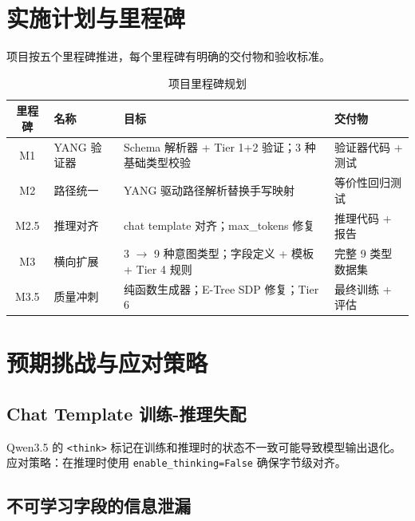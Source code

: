 \documentclass[12pt, a4paper]{article}
\begin{document}
\section{实施计划与里程碑}
\label{sec:milestones}

项目按五个里程碑推进，每个里程碑有明确的交付物和验收标准。

\begin{table}[H]
\centering
\caption{项目里程碑规划}
\label{tab:milestones}
\small
\begin{tabular}{clp{5.5cm}p{3.5cm}}
\toprule
\textbf{里程碑} & \textbf{名称} & \textbf{目标} & \textbf{交付物} \\
\midrule
M1 & YANG 验证器 &
  Schema 解析器 + Tier 1+2 验证；3 种基础类型校验 &
  验证器代码 + 测试 \\
\addlinespace
M2 & 路径统一 &
  YANG 驱动路径解析替换手写映射 &
  等价性回归测试 \\
\addlinespace
M2.5 & 推理对齐 &
  chat template 对齐；max\_tokens 修复 &
  推理代码 + 报告 \\
\addlinespace
M3 & 横向扩展 &
  3 $\to$ 9 种意图类型；字段定义 + 模板 + Tier 4 规则 &
  完整 9 类型数据集 \\
\addlinespace
M3.5 & 质量冲刺 &
  纯函数生成器；E-Tree SDP 修复；Tier 6 &
  最终训练 + 评估 \\
\bottomrule
\end{tabular}
\end{table}

\section{预期挑战与应对策略}
\label{sec:challenges}

\subsection{Chat Template 训练-推理失配}

Qwen3.5 的 \texttt{<think>} 标记在训练和推理时的状态不一致可能导致模型输出退化。应对策略：在推理时使用 \texttt{enable\_thinking=False} 确保字节级对齐。

\subsection{不可学习字段的信息泄漏}
\end{document}
